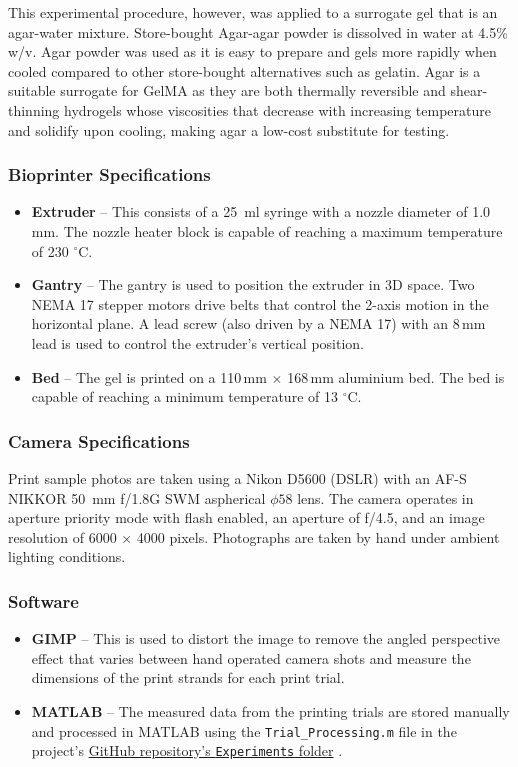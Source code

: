 This experimental procedure, however, was applied to a surrogate gel that is an agar-water mixture. Store-bought Agar-agar powder is dissolved in water at 4.5\% w/v. Agar powder was used as it is easy to prepare and gels more rapidly when cooled compared to other store-bought alternatives such as gelatin. Agar is a suitable surrogate for GelMA as they are both thermally reversible and shear-thinning hydrogels whose viscosities that decrease with increasing temperature and solidify upon cooling, making agar a low-cost substitute for testing.

\subsubsection*{Bioprinter Specifications}
\begin{itemize}
    \item \textbf{Extruder} – This consists of a 25~ml syringe with a nozzle diameter of 1.0\,mm. The nozzle heater block is capable of reaching a maximum temperature of 230 $^{\circ}$C.
    
    \item \textbf{Gantry} – The gantry is used to position the extruder in 3D space. Two NEMA 17 stepper motors drive belts that control the 2-axis motion in the horizontal plane. A lead screw (also driven by a NEMA 17) with an 8\,mm lead is used to control the extruder’s vertical position.
    
    \item \textbf{Bed} – The gel is printed on a 110\,mm $\times$ 168\,mm aluminium bed. The bed is capable of reaching a minimum temperature of 13 $^{\circ}$C.
\end{itemize}
\subsubsection*{Camera Specifications}
Print sample photos are taken using a Nikon D5600 (DSLR) with an AF-S NIKKOR 50~mm f/1.8G SWM aspherical $\phi58$ lens. The camera operates in aperture priority mode with flash enabled, an aperture of f/4.5, and an image resolution of 6000 × 4000 pixels. Photographs are taken by hand under ambient lighting conditions.

\subsubsection*{Software}
\begin{itemize}
    \item \textbf{GIMP} – This is used to distort the image to remove the angled perspective effect that varies between hand operated camera shots and measure the dimensions of the print strands for each print trial.
    \item \textbf{MATLAB} – The measured data from the printing trials are stored manually and processed in MATLAB using the \texttt{Trial\_Processing.m} file in the project’s \href{https://github.com/SimonDaniel605/Hydrogel-3D-Printer/tree/main/Experiments}{GitHub repository's \texttt{Experiments} folder} \citep{Daniel2025_HydrogelPrinter}.
\end{itemize}

